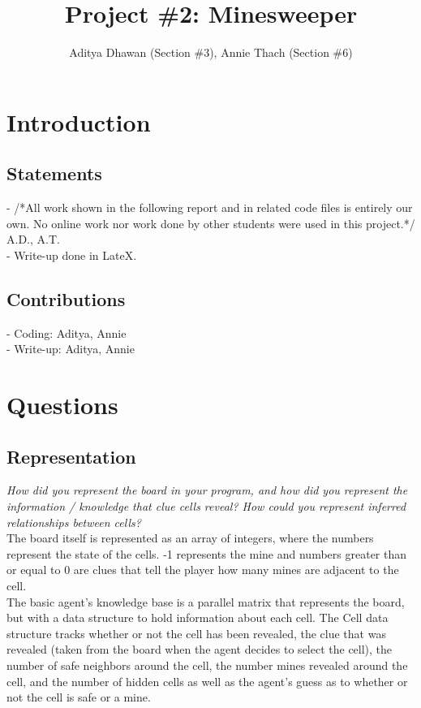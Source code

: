 \documentclass[11pt]{article} %
\title{\textbf{Project \#2: Minesweeper}}
\author{Aditya Dhawan (Section \#3),  Annie Thach (Section \#6)}
\date{} %
\begin{document}
\maketitle

\section{\textbf{Introduction}}

\subsection{Statements}

- /*All work shown in the following report and in related code files is entirely our own. No online work nor work done by other students were used in this project.*/ A.D., A.T. \\- Write-up done in LateX.

\subsection{Contributions}

- Coding: Aditya, Annie
\\
- Write-up: Aditya, Annie

\section{\textbf{Questions}}

\subsection{Representation}

\textit{How did you represent the board in your program, and how did you represent the information / knowledge that clue cells reveal? How could you represent inferred relationships between cells?}\\

The board itself is represented as an array of integers, where the numbers represent the state of the cells. -1 represents the mine and numbers greater than or equal to 0 are clues that tell the player how many mines are adjacent to the cell.\\

The basic agent’s knowledge base is a parallel matrix that represents the board, but with a data structure to hold information about each cell. The Cell data structure tracks whether or not the cell has been revealed, the clue that was revealed (taken from the board when the agent decides to select the cell), the number of safe neighbors around the cell, the number mines revealed around the cell, and the number of hidden cells as well as the agent’s guess as to whether or not the cell is safe or a mine.\\
\end{document}
